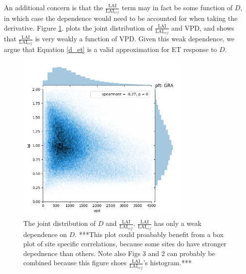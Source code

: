 \documentclass[draft,linenumbers]{agujournal}
\begin{document}
An additional concern is that the $\frac{\text{LAI}}{\text{LAI$_{ref}$}}$ term may in fact be some function of $D$, in which case the dependence would need to be accounted for when taking the derivative. Figure \ref{lai_vpd_fig}. plots the joint distribution of $\frac{\text{LAI}}{\text{LAI$_{ref}$}}$ and VPD, and shows that $\frac{\text{LAI}}{\text{LAI$_{ref}$}}$ is very weakly a function of VPD. Given this weak dependence, we argue that Equation \ref{d_et} is a valid approximation for ET response to $D$.

\begin{figure}[h]
\centering
\includegraphics[width=20pc]{./fig03.png}
\caption{The joint distribution of $D$ and $\frac{\text{LAI}}{\text{LAI$_{ref}$}}$. $\frac{\text{LAI}}{\text{LAI$_{ref}$}}$ has only a weak dependence on $D$. ***This plot could proabably benefit from a box plot of site specific correlations, because some sites do have stronger depednence than others. Note also Figs 3 and 2 can probably be combined because this figure shoes $\frac{\text{LAI}}{\text{LAI$_{ref}$}}$'s histogram.***}
\label{lai_vpd_fig}
\end{figure}
\end{document}
